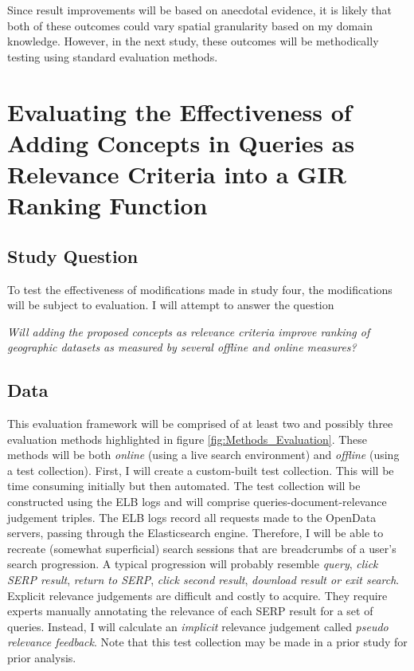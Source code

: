 Since result improvements will be based on anecdotal evidence, it is likely that both of these outcomes could vary spatial granularity based on my domain knowledge. However, in the next study, these outcomes will be methodically testing using standard evaluation methods.

\section{Evaluating the Effectiveness of Adding Concepts in Queries as Relevance Criteria into a GIR Ranking Function}

\subsection{Study Question}
To test the effectiveness of modifications made in study four, the modifications will be subject to evaluation. I will attempt to answer the question
\linebreak

\emph{Will adding the proposed concepts as relevance criteria improve ranking of geographic datasets as measured by several offline and online measures?}
\linebreak

\subsection{Data}
This evaluation framework will be comprised of at least two and possibly three evaluation methods highlighted in figure \ref{fig:Methods_Evaluation}. These methods will be both \emph{online} (using a live search environment) and \emph{offline} (using a test collection). First, I will create a custom-built test collection. This will be time consuming initially but then automated. The test collection will be constructed using the ELB logs and will comprise queries-document-relevance judgement triples. The ELB logs record all requests made to the OpenData servers, passing through the Elasticsearch engine. Therefore, I will be able to recreate (somewhat superficial) search sessions that are breadcrumbs of a user's search progression. A typical progression will probably resemble \emph{query}, \emph{click SERP result}, \emph{return to SERP}, \emph{click second result}, \emph{download result or exit search}. Explicit relevance judgements are difficult and costly to acquire. They require experts manually annotating the relevance of each SERP result for a set of queries. Instead, I will calculate an \emph{implicit} relevance judgement called \emph{pseudo relevance feedback}. Note that this test collection may be made in a prior study for prior analysis.

